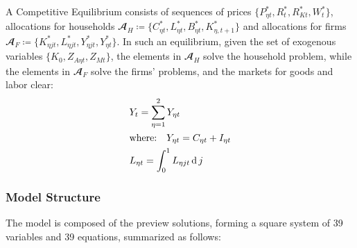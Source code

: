 \documentclass[
thesis.tex
]{subfiles}
\begin{document}
A Competitive Equilibrium consists of sequences of prices $\{P_{\eta t}^\ast, R_t^\ast, R_{Kt}^\ast, W_t^\ast\}$, allocations for households $\mathbfscr{A}_H \coloneq \{C_{\eta t}^\ast, L_{\eta t}^\ast, B_{\eta t}^\ast, K_{\eta, t+1}^\ast\}$ and allocations  for firms $\mathbfscr{A}_F \coloneq \{K_{\eta jt}^\ast, L_{\eta jt}^\ast, Y_{\eta jt}^\ast, Y_{\eta t}^\ast\}$. In such an equilibrium, given the set of exogenous variables $\{K_0, Z_{A\eta t}, Z_{Mt}\}$, the elements in $\mathbfscr{A}_H$ solve the household problem, while the elements in $\mathbfscr{A}_F$ solve the firms' problems, and the markets for goods and labor clear:
\begin{align}
	& Y_t = \sum_{\eta=1}^{2} Y_{\eta t} \label{eq:reg-market-clearing-condition} \\
	& \text{where:} \quad Y_{\eta t} = C_{\eta t} + I_{\eta t} \label{eq:reg-total-yn} \\
	& L_{\eta t} = \int_{0}^{1} L_{\eta jt} \operatorname{d} j \label{eq:reg-market-clearing-condition-2}
\end{align}



\subsubsection{Model Structure}

The model is composed of the preview solutions, forming a square system of 39 variables and 39 equations, summarized as follows:
\end{document}
